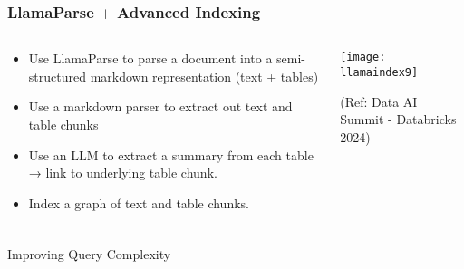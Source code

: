 \begin{frame}[fragile]\frametitle{LlamaParse $+$ Advanced Indexing}


\begin{columns}
    \begin{column}[T]{0.4\linewidth}

		\begin{itemize}
		\item Use LlamaParse to parse a document into a semi-structured markdown representation (text + tables)
		\item Use a markdown parser to extract out text and table chunks
		\item Use an LLM to extract a summary from each table → link to underlying table chunk.
		\item Index a graph of text and table chunks.
		\end{itemize}	
		
    \end{column}
    \begin{column}[T]{0.6\linewidth}
		\begin{center}
		\texttt{[image: llamaindex9]}

		{\tiny (Ref: Data AI Summit - Databricks 2024)}
		\end{center}
    \end{column}
  \end{columns}
  


\end{frame}



\begin{frame}[fragile]\frametitle{}
\begin{center}
{\Large Improving Query Complexity}
\end{center}
\end{frame}


